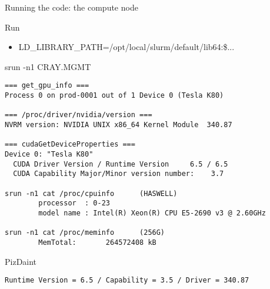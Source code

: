 \begin{frame}[fragile]{Running the code: the compute node}
\begin{info}{Run}
\begin{itemize}
 \item LD\_LIBRARY\_PATH=/opt/local/slurm/default/lib64:\$...
\end{itemize}
\end{info}

\begin{code}{srun -n1 CRAY.MGMT}
\begin{lstlisting}[style=boxcudatiny]
=== get_gpu_info ===
Process 0 on prod-0001 out of 1 Device 0 (Tesla K80)

=== /proc/driver/nvidia/version ===
NVRM version: NVIDIA UNIX x86_64 Kernel Module  340.87

=== cudaGetDeviceProperties ===
Device 0: "Tesla K80"
  CUDA Driver Version / Runtime Version     6.5 / 6.5
  CUDA Capability Major/Minor version number:    3.7

srun -n1 cat /proc/cpuinfo      (HASWELL)
        processor  : 0-23
        model name : Intel(R) Xeon(R) CPU E5-2690 v3 @ 2.60GHz 

srun -n1 cat /proc/meminfo      (256G)
        MemTotal:       264572408 kB
\end{lstlisting}
\end{code}

\begin{code}{PizDaint}
\begin{lstlisting}[style=boxcudatiny]
Runtime Version = 6.5 / Capability = 3.5 / Driver = 340.87
\end{lstlisting}
\end{code}

\end{frame}




